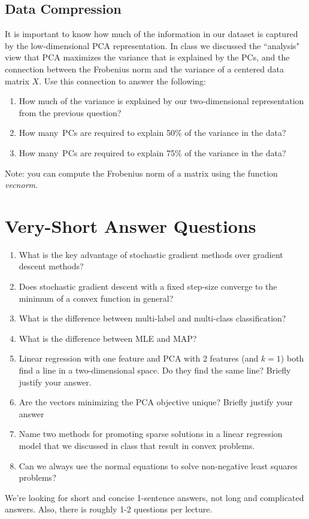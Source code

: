 \documentclass{article}
\def\blu#1{{\color{blu}#1}}
\def\enum#1{\begin{enumerate}#1\end{enumerate}}
\begin{document}
\subsection{Data Compression}

It is important to know how much of the information in our dataset is captured by the low-dimensional PCA representation.
In class we discussed the ``analysis" view that PCA maximizes the variance that is explained by the PCs, and the connection between the Frobenius norm and the variance of a centered data matrix $X$. Use this connection to answer the following:
\blu{\enum{
\item How much of the variance is explained by our two-dimensional representation from the previous question?
\item How many\ PCs are required to explain 50\% of the variance in the data?
\item How many\ PCs are required to explain 75\% of the variance in the data?
}}
Note: you can compute the Frobenius norm of a matrix using the function \emph{vecnorm}.




\section{Very-Short Answer Questions}


\enum{
\item What is the key advantage of stochastic gradient methods over gradient descent methods?
\item Does stochastic gradient descent with a fixed step-size converge to the minimum of a convex function in general?
\item What is the difference between multi-label and multi-class classification?
\item What is the difference between MLE and MAP?
\item Linear regression with one feature and PCA with 2 features (and $k=1$) both find a line in a two-dimensional space. Do they find the same line?
 Briefly justify your answer.
\item Are the vectors minimizing the PCA objective unique? Briefly justify your answer
\item Name two methods for promoting sparse solutions in a linear regression model that we discussed in class that result in convex problems.
\item Can we always use the normal equations to solve non-negative least squares problems?
}
We're looking for short and concise 1-sentence answers, not long and complicated answers. Also, there is roughly 1-2 questions per lecture.
\end{document}
